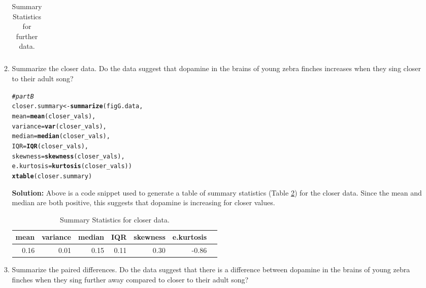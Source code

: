 \documentclass{article}\usepackage[]{graphicx}\usepackage[]{xcolor}
\makeatletter
\newcommand{\hlcom}[1]{\textcolor[rgb]{0.678,0.584,0.686}{\textit{#1}}}%
\newcommand{\hldef}[1]{\textcolor[rgb]{0.345,0.345,0.345}{#1}}%
\newcommand{\hlkwb}[1]{\textcolor[rgb]{0.69,0.353,0.396}{#1}}%
\newcommand{\hlkwc}[1]{\textcolor[rgb]{0.333,0.667,0.333}{#1}}%
\newcommand{\hlkwd}[1]{\textcolor[rgb]{0.737,0.353,0.396}{\textbf{#1}}}%
\newenvironment{kframe}{%
 \def\at@end@of@kframe{}%
 \ifinner\ifhmode%
  \def\at@end@of@kframe{\end{minipage}}%
  \begin{minipage}{\columnwidth}%
 \fi\fi%
 \def\FrameCommand##1{\hskip\@totalleftmargin \hskip-\fboxsep
 \colorbox{shadecolor}{##1}\hskip-\fboxsep
     \hskip-\linewidth \hskip-\@totalleftmargin \hskip\columnwidth}%
 \MakeFramed {\advance\hsize-\width
   \@totalleftmargin\z@ \linewidth\hsize
   \@setminipage}}%
 {\par\unskip\endMakeFramed%
 \at@end@of@kframe}
\newenvironment{knitrout}{}{} %
\makeatother
\begin{document}
\begin{enumerate}
\begin{enumerate}
\begin{table}[ht]
\begin{tabular}{rrrrrrr}
   \hline
\end{tabular}
\caption{Summary Statistics for further data.}
\label{table2}
\end{table}
   \item Summarize the closer data. Do the data suggest that
   dopamine in the brains of young zebra finches increases when
   they sing closer to their adult song?
\begin{knitrout}
\color{fgcolor}\begin{kframe}
\begin{alltt}
 \hlcom{# part B}
 \hldef{closer.summary} \hlkwb{<-} \hlkwd{summarize}\hldef{(figG.data,}
                          \hlkwc{mean} \hldef{=} \hlkwd{mean}\hldef{(closer_vals),}
                          \hlkwc{variance} \hldef{=} \hlkwd{var}\hldef{(closer_vals),}
                          \hlkwc{median} \hldef{=} \hlkwd{median}\hldef{(closer_vals),}
                          \hlkwc{IQR} \hldef{=} \hlkwd{IQR}\hldef{(closer_vals),}
                          \hlkwc{skewness} \hldef{=} \hlkwd{skewness}\hldef{(closer_vals),}
                          \hlkwc{e.kurtosis} \hldef{=} \hlkwd{kurtosis}\hldef{(closer_vals))}
 \hlkwd{xtable}\hldef{(closer.summary)}
\end{alltt}
\end{kframe}
\end{knitrout}
  \textbf{Solution:} Above is a code snippet used to generate a table of summary statistics (Table \ref{table3}) for the closer data. Since the mean and median are both positive, this suggests that dopamine is increasing for closer values. 
\begin{table}[ht]
\centering
\begin{tabular}{rrrrrrr}
  \hline
 mean & variance & median & IQR & skewness & e.kurtosis \\ 
  \hline
 0.16 & 0.01 & 0.15 & 0.11 & 0.30 & -0.86 \\ 
   \hline
\end{tabular}
\caption{Summary Statistics for closer data.}
\label{table3}
\end{table}
  \item Summarize the paired differences. Do the data suggest
  that there is a difference between dopamine in the brains of
  young zebra finches when they sing further away compared to 
  closer to their adult song?


\end{enumerate}
\end{enumerate}
\end{document}
